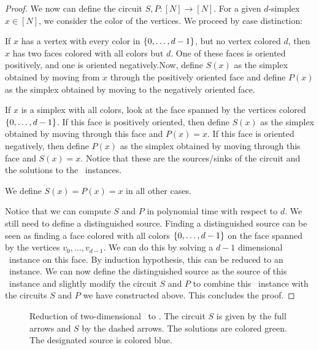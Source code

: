 \begin{proof}
	We now can define the circuit $S, P : [N] \rightarrow [N]$. For a given $d$-simplex $x \in [N]$, we consider the color of the vertices. We proceed by case distinction:
	\begin{case}{1}
		If $x$ has a vertex with every color in $\left\{0, \dots, d-1\right\}$, but no vertex colored $d$, then $x$ has two faces colored with all colors but $d$. One of these faces is oriented positively, and one is oriented negatively.Now, define $S(x)$ as the simplex obtained by moving from $x$ through the positively oriented face and define $P(x)$ as the simplex obtained by moving to the negatively oriented face.
	\end{case}
	\begin{case}{2}
		If $x$ is a simplex with all colors, look at the face spanned by the vertices colored $\left\{0, \dots, d-1\right\}$. If this face is positively oriented, then define $S(x)$ as the simplex obtained by moving through this face and $P(x) = x$. If this face is oriented negatively, then define $P(x)$ as the simplex obtained by moving through this face and $S(x) = x$. Notice that these are the sources/sinks of the circuit and the solutions to the \Sperner\ instances.
	\end{case}
	\begin{case}{3}
		We define $S(x) = P(x) = x$ in all other cases.
	\end{case}
	Notice that we can compute $S$ and $P$ in polynomial time with respect to $d$. We still need to define a distinguished source. Finding a distinguished source can be seen as finding a face colored with all colors $\left\{0, \dots, d-1\right\}$ on the face spanned by the vertices $v_0, \dots, v_{d-1}$. We can do this by solving a $d-1$ dimensional \Sperner\ instance on this face. By induction hypothesis, this can be reduced to an \EndOfLine\ instance. We can now define the distinguished source as the source of this \EndOfLine\ instance and slightly modify the circuit $S$ and $P$ to combine this \EndOfLine\ instance with the circuits $S$ and $P$ we have constructed above. This concludes the proof.
\end{proof}
\begin{figure}
	\centering
	\caption[Reduction of \Sperner\ to \EndOfLine]{Reduction of two-dimensional \Sperner\ to \EndOfLine. The circuit $S$ is given by the full arrows and $S$ by the dashed arrows. The solutions are colored green. The designated source is colored blue.}\label{fig:sperner_eol_reduction}
\end{figure}

